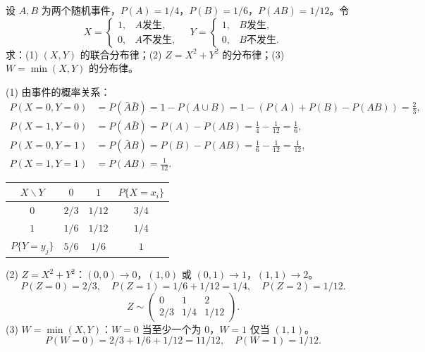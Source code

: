 ﻿\documentclass[lang=cn,11pt]{elegantbook}
\begin{document}
\begin{exercise}[事件的示性函数] \label{exer:3-d1}
设 $A,B$ 为两个随机事件，$P(A) = 1/4$，$P(B) = 1/6$，$P(AB) = 1/12$。令
\[
X = \begin{cases} 1, & A \text{发生}, \\ 0, & A \text{不发生}, \end{cases} \quad Y = \begin{cases} 1, & B \text{发生}, \\ 0, & B \text{不发生}. \end{cases}
\]
求：(1) $(X,Y)$ 的联合分布律；(2) $Z = X^2+Y^2$ 的分布律；(3) $W = \min(X,Y)$ 的分布律。
\end{exercise}
\begin{solution}
(1) 由事件的概率关系：
\begin{align*}
P(X=0,Y=0) &= P(\bar{A}\bar{B}) = 1 - P(A\cup B) = 1 - (P(A)+P(B)-P(AB)) = \frac{2}{3}, \\
P(X=1,Y=0) &= P(A\bar{B}) = P(A) - P(AB) = \frac{1}{4}-\frac{1}{12} = \frac{1}{6}, \\
P(X=0,Y=1) &= P(\bar{A}B) = P(B) - P(AB) = \frac{1}{6}-\frac{1}{12} = \frac{1}{12}, \\
P(X=1,Y=1) &= P(AB) = \frac{1}{12}.
\end{align*}
\begin{center}
\begin{tabular}{c|cc|c}
\toprule
$X \backslash Y$ & $0$ & $1$ & $P\{X=x_i\}$ \\
\midrule
$0$ & $2/3$ & $1/12$ & $3/4$ \\[4pt]
$1$ & $1/6$ & $1/12$ & $1/4$ \\
\midrule
$P\{Y=y_j\}$ & $5/6$ & $1/6$ & $1$ \\
\bottomrule
\end{tabular}
\end{center}
(2) $Z = X^2+Y^2$：$(0,0)\to 0$，$(1,0)$ 或 $(0,1)\to 1$，$(1,1)\to 2$。
\[
P(Z=0) = 2/3,\quad P(Z=1) = 1/6+1/12 = 1/4,\quad P(Z=2) = 1/12.
\]
\[
Z \sim \begin{pmatrix} 0 & 1 & 2 \\ 2/3 & 1/4 & 1/12 \end{pmatrix}.
\]
(3) $W = \min(X,Y)$：$W=0$ 当至少一个为 $0$，$W=1$ 仅当 $(1,1)$。
\[
P(W=0) = 2/3+1/6+1/12 = 11/12,\quad P(W=1) = 1/12.
\]
\end{solution}
\end{document}
